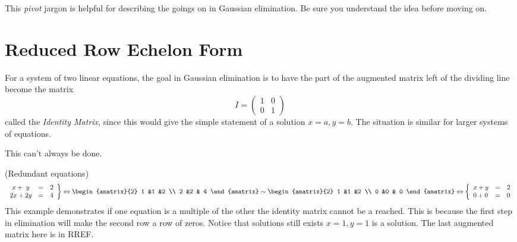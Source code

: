 This {\itshape pivot} jargon is helpful for describing the goings on in Gaussian elimination. Be sure you understand the idea before moving on. 


\section{Reduced Row Echelon Form}
For a system of two linear  equations, the goal in Gaussian elimination is to have the part of the augmented matrix left of the dividing line become the matrix
 \[I=    \begin{pmatrix}
      1             &0  \\
      0             &1
    \end{pmatrix}\] 
called the \emph{Identity Matrix}, since this would give the simple statement of a solution $x=a,y=b$. The situation is similar for larger systems of equations.



\noindent
This can't always be done.

\begin{example} (Redundant equations)
\[
   \left.
\begin{array}{lcr}
	\ x + \ y & = & 2 \\
	2x + 2y & = &  4
     \end{array}
   \right\} 
   \Leftrightarrow
\begin{amatrix}{2}
1 &1 &2 \\ 2 &2 & 4
\end{amatrix}
\sim
\begin{amatrix}{2}
1 &1 &2 \\ 0 &0 & 0
\end{amatrix}
\Leftrightarrow
\left\{
\begin{array}{lcr}
	x + y & = & 2 \\
	 0 + 0 & = &  0
     \end{array}
   \right.
\]
This example demonstrates if one equation is a multiple of the other the identity matrix cannot be a reached. This is because the first step in elimination will make the second row a row of zeros. Notice that solutions still exists $x=1,y=1$ is a solution. The last augmented matrix here is in RREF.
\end{example}

